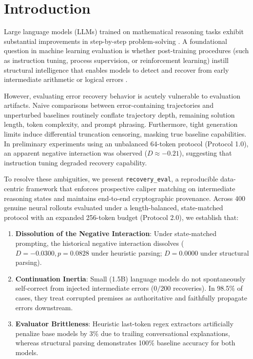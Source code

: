 \documentclass[10pt,conference]{IEEEtran}
\begin{document}
\section{Introduction}
Large language models (LLMs) trained on mathematical reasoning tasks exhibit substantial improvements in step-by-step problem-solving \cite{cobbe2021gsm8k, qwen25math2024}. A foundational question in machine learning evaluation is whether post-training procedures (such as instruction tuning, process supervision, or reinforcement learning) instill structural intelligence that enables models to detect and recover from early intermediate arithmetic or logical errors \cite{lightman2023process, zelikman2022star}.

However, evaluating error recovery behavior is acutely vulnerable to evaluation artifacts. Naive comparisons between error-containing trajectories and unperturbed baselines routinely conflate trajectory depth, remaining solution length, token complexity, and prompt phrasing. Furthermore, tight generation limits induce differential truncation censoring, masking true baseline capabilities. In preliminary experiments using an unbalanced 64-token protocol (Protocol 1.0), an apparent negative interaction was observed ($D \approx -0.21$), suggesting that instruction tuning degraded recovery capability.

To resolve these ambiguities, we present \texttt{recovery\_eval}, a reproducible data-centric framework that enforces prospective caliper matching on intermediate reasoning states and maintains end-to-end cryptographic provenance. Across 400 genuine neural rollouts evaluated under a length-balanced, state-matched protocol with an expanded 256-token budget (Protocol 2.0), we establish that:
\begin{enumerate}
    \item \textbf{Dissolution of the Negative Interaction}: Under state-matched prompting, the historical negative interaction dissolves ($D = -0.0300, p = 0.0828$ under heuristic parsing; $D = 0.0000$ under structural parsing).
    \item \textbf{Continuation Inertia}: Small (1.5B) language models do not spontaneously self-correct from injected intermediate errors ($0/200$ recoveries). In 98.5\% of cases, they treat corrupted premises as authoritative and faithfully propagate errors downstream.
    \item \textbf{Evaluator Brittleness}: Heuristic last-token regex extractors artificially penalize base models by 3\% due to trailing conversational explanations, whereas structural parsing demonstrates 100\% baseline accuracy for both models.
\end{enumerate}
\end{document}
